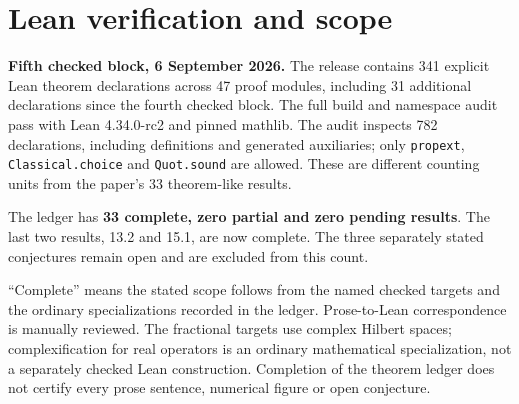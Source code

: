 \clearpage
\appendix
\section{Lean verification and scope}\label{sec:lean-status}
\noindent\textbf{Fifth checked block, 6 September 2026.}
The release contains 341 explicit Lean theorem declarations across 47 proof modules,
including 31 additional declarations since the fourth checked block. The full
build and namespace audit pass with Lean 4.34.0-rc2 and pinned mathlib. The audit
inspects 782 declarations, including definitions and generated auxiliaries; only
\texttt{propext}, \texttt{Classical.choice} and \texttt{Quot.sound} are allowed.
These are different counting units from the paper's 33 theorem-like results.

The ledger has \textbf{33 complete, zero partial and zero pending results}.
The last two results, 13.2 and 15.1, are now complete. The three separately stated
conjectures remain open and are excluded from this count.

``Complete'' means the stated scope follows from the named checked targets
and the ordinary specializations recorded in the ledger. Prose-to-Lean correspondence
is manually reviewed. The fractional targets use complex Hilbert spaces;
complexification for real operators is an ordinary mathematical specialization,
not a separately checked Lean construction. Completion of the theorem ledger does
not certify every prose sentence, numerical figure or open conjecture.

